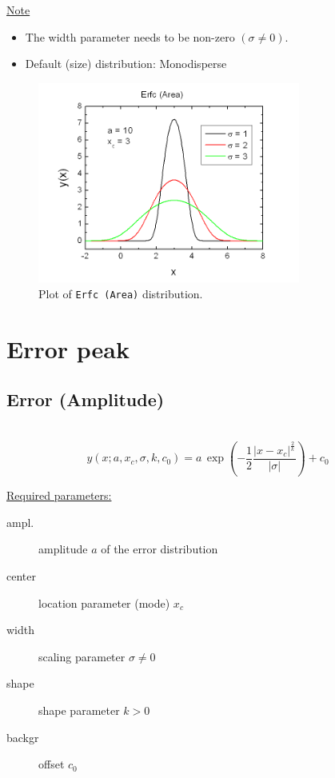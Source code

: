 \uline{Note}
\begin{itemize}
  \item The width parameter needs to be non-zero $(\sigma\neq 0)$.
  \item Default (size) distribution: Monodisperse
\end{itemize}
\begin{figure}[htb]
\begin{center}
\includegraphics[width=0.768\textwidth]{ErfcArea.png}
\end{center}
\caption{Plot of \texttt{Erfc (Area)} distribution.}
\label{fig:ErfcArea}
\end{figure}

\clearpage
\section{Error peak}
\label{sec:ErrorPeak}
\subsection{Error (Amplitude)} \hspace{1pt} \\
\label{sec:ErrorPeakAmplitude}
\begin{equation}
y(x;a,x_c,\sigma,k,c_0) = a \, \exp\left(-\frac{1}{2}\frac{\left|x-x_c\right|^{\frac{2}{k}}}{\left|\sigma\right|}\right)+c_0
\end{equation}
\vspace{5mm}

\uline{Required parameters:}
\begin{description}
    \item[ampl.] amplitude $a$ of the error distribution
    \item[center] location parameter (mode) $x_c$
    \item[width] scaling parameter $\sigma\neq 0$
    \item[shape] shape parameter $k>0$
    \item[backgr] offset $c_0$
\end{description}

